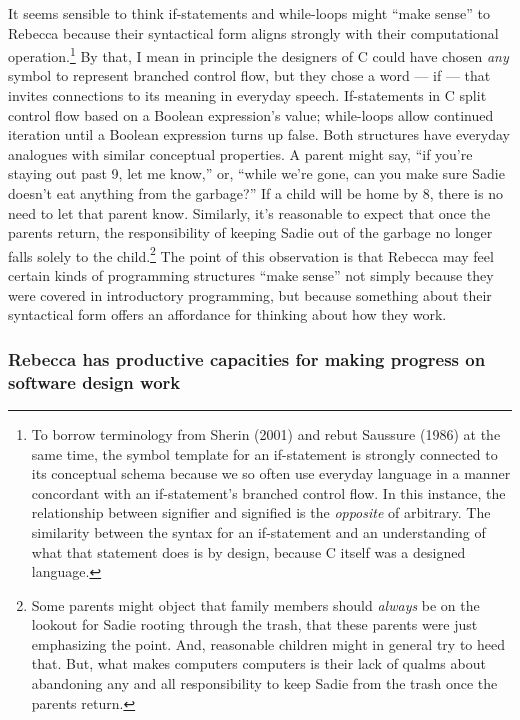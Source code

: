 It seems sensible to think if-statements and while-loops might ``make
sense'' to Rebecca because their syntactical form aligns strongly with
their computational operation.\footnote{To borrow terminology from
  Sherin (2001) and rebut Saussure (1986) at the same time, the symbol
  template for an if-statement is strongly connected to its conceptual
  schema because we so often use everyday language in a manner
  concordant with an if-statement's branched control flow. In this
  instance, the relationship between signifier and signified is the
  \emph{opposite} of arbitrary. The similarity between the syntax for an
  if-statement and an understanding of what that statement does is by
  design, because C itself was a designed language.} By that, I mean in
principle the designers of C could have chosen \emph{any} symbol to
represent branched control flow, but they chose a word --- if --- that
invites connections to its meaning in everyday speech. If-statements in
C split control flow based on a Boolean expression's value; while-loops
allow continued iteration until a Boolean expression turns up false.
Both structures have everyday analogues with similar conceptual
properties. A parent might say, ``if you're staying out past 9, let me
know,'' or, ``while we're gone, can you make sure Sadie doesn't eat
anything from the garbage?'' If a child will be home by 8, there is no
need to let that parent know. Similarly, it's reasonable to expect that
once the parents return, the responsibility of keeping Sadie out of the
garbage no longer falls solely to the child.\footnote{Some parents might
  object that family members should \emph{always} be on the lookout for
  Sadie rooting through the trash, that these parents were just
  emphasizing the point. And, reasonable children might in general try
  to heed that. But, what makes computers computers is their lack of
  qualms about abandoning any and all responsibility to keep Sadie from
  the trash once the parents return.} The point of this observation is
that Rebecca may feel certain kinds of programming structures ``make
sense'' not simply because they were covered in introductory
programming, but because something about their syntactical form offers
an affordance for thinking about how they work.

\subsubsection{Rebecca has productive capacities for making progress on
software design
work}\label{rebecca-has-productive-capacities-for-making-progress-on-software-design-work}

